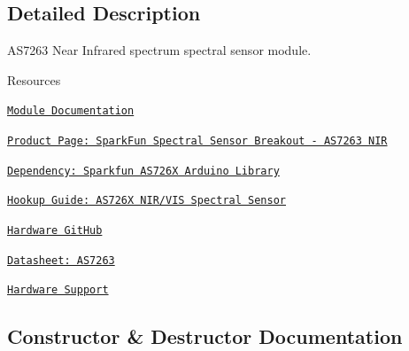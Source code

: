 \subsection{Detailed Description}
A\+S7263 Near Infrared spectrum spectral sensor module. 

\begin{DoxyParagraph}{Resources}

\begin{DoxyItemize}
\item \href{https://openslab-osu.github.io/Loom/html/class_loom___a_s7263.html}{\tt Module Documentation}
\item \href{https://www.sparkfun.com/products/14351}{\tt Product Page\+: Spark\+Fun Spectral Sensor Breakout -\/ A\+S7263 N\+IR}
\item \href{https://github.com/sparkfun/Qwiic_Spectral_Sensor_AS726X/tree/master/Libraries/Arduino}{\tt Dependency\+: Sparkfun A\+S726X Arduino Library}
\item \href{https://learn.sparkfun.com/tutorials/as726x-nirvi}{\tt Hookup Guide\+: A\+S726X N\+I\+R/\+V\+IS Spectral Sensor}
\item \href{https://github.com/sparkfun/Qwiic_Spectral_Sensor_AS726X}{\tt Hardware Git\+Hub}
\item \href{https://cdn.sparkfun.com/assets/1/b/7/3/b/AS7263.pdf}{\tt Datasheet\+: A\+S7263}
\item \href{https://github.com/OPEnSLab-OSU/Loom/wiki/Hardware-Support#as7263-spectral-sensor-near-infrared}{\tt Hardware Support} 
\end{DoxyItemize}
\end{DoxyParagraph}


\subsection{Constructor \& Destructor Documentation}
